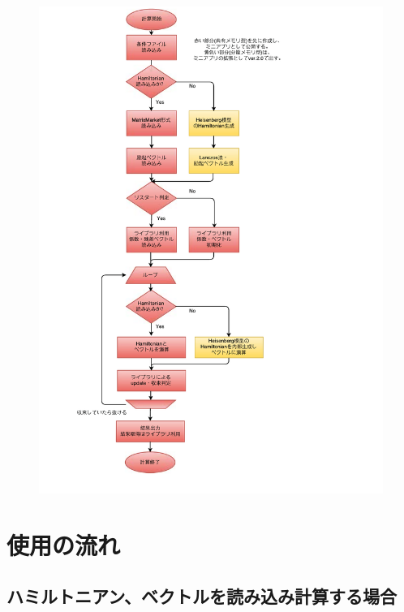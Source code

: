 \documentclass[12pt,titlepage]{jarticle}
\begin{document}
\begin{figure}[htbp]
\begin{center}
	\includegraphics[width=12cm]{flow.pdf}
	\label{Fig:CalcFlow}
\end{center}
\end{figure}


\newpage
\section{使用の流れ}\label{Sec:Usage}
\subsection{ハミルトニアン、ベクトルを読み込み計算する場合}
\end{document}
